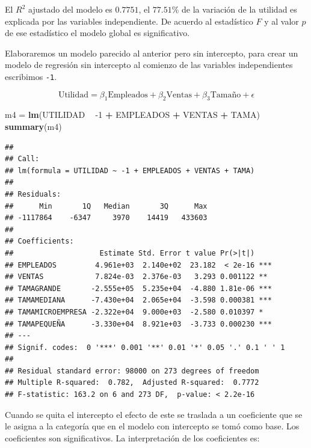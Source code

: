 \documentclass[letterpaper,]{book}
\newenvironment{Shaded}{\begin{snugshade}}{\end{snugshade}}
\newcommand{\DecValTok}[1]{\textcolor[rgb]{0.00,0.00,0.81}{#1}}
\newcommand{\KeywordTok}[1]{\textcolor[rgb]{0.13,0.29,0.53}{\textbf{#1}}}
\newcommand{\NormalTok}[1]{#1}
\newcommand{\OperatorTok}[1]{\textcolor[rgb]{0.81,0.36,0.00}{\textbf{#1}}}
\newcommand{\StringTok}[1]{\textcolor[rgb]{0.31,0.60,0.02}{#1}}
\begin{document}
El \(R^2\) ajustado del modelo es \(0.7751\), el \(77.51\)\% de la variación de la utilidad es explicada por las variables independiente. De acuerdo al estadístico \(F\) y al valor \(p\) de ese estadístico el modelo global es significativo.

Elaboraremos un modelo parecido al anterior pero sin intercepto, para crear un modelo de regresión sin intercepto al comienzo de las variables independientes escribimos \texttt{-1}.

\begin{equation}
  \text{Utilidad} =  \beta_1 \text{Empleados} + \beta_2 \text{Ventas} + \beta_3 \text{Tamaño} + \epsilon
    \label{eq:modelo5}
\end{equation}

\begin{Shaded}
\begin{Highlighting}[]
\NormalTok{m4 =}\StringTok{ }\KeywordTok{lm}\NormalTok{(UTILIDAD }\OperatorTok{~}\StringTok{ }\DecValTok{-1} \OperatorTok{+}\StringTok{ }\NormalTok{EMPLEADOS }\OperatorTok{+}\StringTok{ }\NormalTok{VENTAS }\OperatorTok{+}\StringTok{ }\NormalTok{TAMA)}
\KeywordTok{summary}\NormalTok{(m4)}
\end{Highlighting}
\end{Shaded}

\begin{verbatim}
## 
## Call:
## lm(formula = UTILIDAD ~ -1 + EMPLEADOS + VENTAS + TAMA)
## 
## Residuals:
##      Min       1Q   Median       3Q      Max 
## -1117864    -6347     3970    14419   433603 
## 
## Coefficients:
##                    Estimate Std. Error t value Pr(>|t|)    
## EMPLEADOS         4.961e+03  2.140e+02  23.182  < 2e-16 ***
## VENTAS            7.824e-03  2.376e-03   3.293 0.001122 ** 
## TAMAGRANDE       -2.555e+05  5.235e+04  -4.880 1.81e-06 ***
## TAMAMEDIANA      -7.430e+04  2.065e+04  -3.598 0.000381 ***
## TAMAMICROEMPRESA -2.322e+04  9.000e+03  -2.580 0.010397 *  
## TAMAPEQUEÑA      -3.330e+04  8.921e+03  -3.733 0.000230 ***
## ---
## Signif. codes:  0 '***' 0.001 '**' 0.01 '*' 0.05 '.' 0.1 ' ' 1
## 
## Residual standard error: 98000 on 273 degrees of freedom
## Multiple R-squared:  0.782,  Adjusted R-squared:  0.7772 
## F-statistic: 163.2 on 6 and 273 DF,  p-value: < 2.2e-16
\end{verbatim}

Cuando se quita el intercepto el efecto de este se traslada a un coeficiente que se le asigna a la categoría que en el modelo con intercepto se tomó como base. Los coeficientes son significativos. La interpretación de los coeficientes es:
\end{document}
